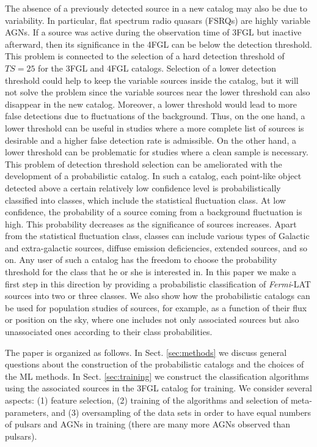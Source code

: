 \documentclass[referee]{aa} %
\newcommand{\Fermi}{\textit{Fermi}\xspace}
\begin{document}
The absence of a previously detected source in a new catalog may also be due to variability.
In particular, flat spectrum radio quasars (FSRQs) are highly variable AGNs.
If a source was active during the observation time of 3FGL but inactive afterward, 
then its significance in the 4FGL can be below the detection threshold.
This problem is connected to the selection of a hard detection threshold of $TS = 25$ for the 3FGL and 4FGL 
catalogs. Selection of a lower detection threshold could help to keep the variable sources inside the catalog, 
but it will not solve the problem since the variable sources near the lower threshold can also disappear in the new catalog.
Moreover, a lower threshold would lead to more false detections due to fluctuations of the background.
Thus, on the one hand, a lower threshold can be useful in studies where a more complete list of sources is desirable and a higher false detection rate is admissible.
On the other hand, a lower threshold can be problematic for studies where 
a clean sample is necessary. 
This problem of detection threshold selection can be ameliorated with the development of a probabilistic catalog.
In such a catalog, each point-like object detected above a certain relatively low confidence level
is probabilistically classified into classes, which include the statistical fluctuation class.
At low confidence, the probability of a source coming from a background fluctuation is high.
This probability decreases as the significance of sources increases.
Apart from the statistical fluctuation class, classes can include various types of Galactic and extra-galactic sources, diffuse emission deficiencies, extended sources, and so on.
Any user of such a catalog has the freedom to choose the probability threshold for the class that he or she is interested in.
In this paper we make a first step in this direction by providing a probabilistic classification of \Fermi-LAT sources into two or three classes.
We also show how the probabilistic catalogs can be used for population studies of sources, for example,
as a function of their flux or position on the sky, where one includes not only associated sources but also unassociated ones according to their class probabilities.

The paper is organized as follows.
In Sect. \ref{sec:methods} we discuss general questions about the construction of the probabilistic catalogs and the choices of the ML methods.
In Sect. \ref{sec:training} we construct the classification algorithms using the associated sources in the 3FGL catalog for training. We consider several aspects: (1) feature selection, (2) training of the algorithms and selection of meta-parameters,
and (3) oversampling of the data sets in order to have equal numbers of pulsars and AGNs in training (there are many more AGNs observed than pulsars).
\end{document}
